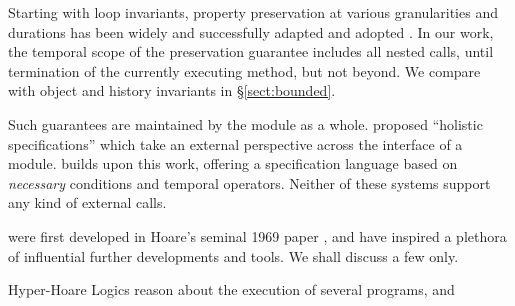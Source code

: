  
 Starting with loop invariants\cite{Hoare69,Floyd67}, property preservation at various granularities and durations has been widely and successfully adapted and adopted \cite{Hoare74,liskov94behavioral,usinghistory,Cohen10,Meyer92,MeyerDBC92,BarDelFahLeiSch04,objInvars,MuellerPoetzsch-HeffterLeavens06,DrossoFrancaMuellerSummers08}.
In our work, the temporal scope of the preservation guarantee includes all nested calls, until termination of the currently executing method, but not beyond. 
We compare with object and history invariants in \S \ref{sect:bounded}.

Such guarantees are maintained by the module as a whole.
\citet{FASE}  proposed ``holistic specifications'' which take an external
perspective across the interface of a module. %
\citet{OOPSLA22} builds upon this work, offering a specification
language based on \emph{necessary} conditions and temporal operators.
Neither of these systems support any kind of external calls.


 were first developed in Hoare's seminal 1969 paper \cite{Hoare69}, and have inspired a plethora of influential further developments and tools. We shall discuss a few only.

%
Hyper-Hoare Logics \cite{hyper-hoare-pldi2024,compositional-hypersafety-oopsla2022}  reason about the execution of several programs, and  

